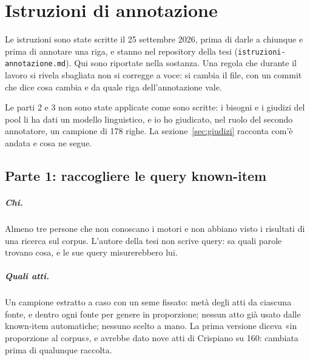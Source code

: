 \chapter{Istruzioni di annotazione}\label{chapter:appendice-annotazione}
\sloppy

Le istruzioni sono state scritte il 25 settembre 2026, prima di darle a chiunque e
prima di annotare una riga, e stanno nel repository della tesi
(\texttt{istruzioni-annotazione.md}). Qui sono riportate nella sostanza. Una
regola che durante il lavoro si rivela sbagliata non si corregge a voce: si cambia
il file, con un commit che dice cosa cambia e da quale riga dell'annotazione vale.

Le parti 2 e 3 non sono state applicate come sono scritte: i bisogni e i
giudizi del pool li ha dati un modello linguistico, e io ho giudicato, nel ruolo
del secondo annotatore, un campione di 178 righe. La
sezione~\ref{sec:giudizi} racconta com'è andata e cosa ne segue.

\section*{Parte 1: raccogliere le query known-item}

\paragraph{Chi.} Almeno tre persone che non conoscano i motori e non abbiano visto
i risultati di una ricerca sul corpus. L'autore della tesi non scrive query: sa
quali parole trovano cosa, e le sue query misurerebbero lui.

\paragraph{Quali atti.} Un campione estratto a caso con un seme fissato: metà degli
atti da ciascuna fonte, e dentro ogni fonte per genere in proporzione; nessun atto
già usato dalle known-item automatiche; nessuno scelto a mano. La prima versione
diceva «in proporzione al corpus», e avrebbe dato nove atti di Crispiano su 160:
cambiata prima di qualunque raccolta.

